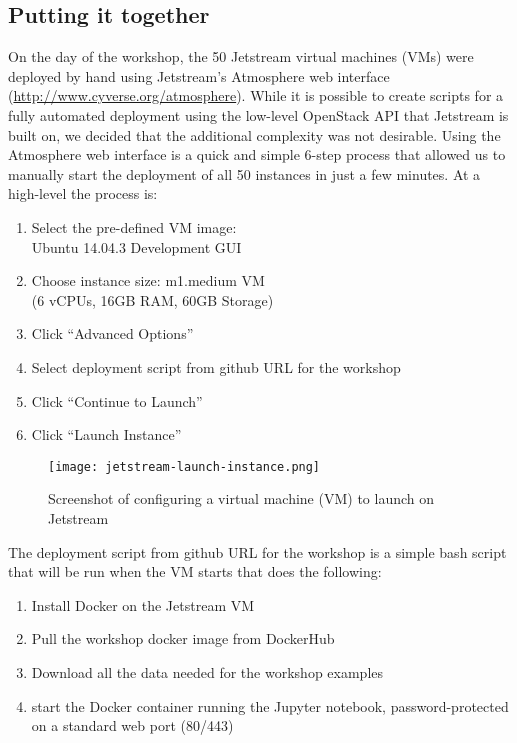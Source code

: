 \subsection{Putting it together}

On the day of the workshop, the 50 Jetstream virtual machines (VMs) were
deployed by hand using Jetstream's Atmosphere\cite{NiravCyberinfra2016} web interface
(\url{http://www.cyverse.org/atmosphere}). While it is possible to create
scripts for a fully automated deployment using the low-level OpenStack API that
Jetstream is built on, we decided that the additional complexity was not
desirable. Using the Atmosphere web interface is a quick and simple 6-step
process that allowed us to manually start the deployment of all 50 instances in
just a few minutes. At a high-level the process is:

\begin{enumerate}
\item Select the pre-defined VM image: \\Ubuntu 14.04.3 Development GUI
\item Choose instance size: m1.medium VM \\(6 vCPUs, 16GB RAM, 60GB
  Storage)
\item Click ``Advanced Options''
\item Select deployment script from github URL for the workshop
\item Click ``Continue to Launch''
\item Click ``Launch Instance''
\end{enumerate}

\begin{figure}[h]
\centering
\texttt{[image: jetstream-launch-instance.png]}
\caption{Screenshot of configuring a virtual machine (VM) to launch on Jetstream}
\end{figure}

The deployment script from github URL for the workshop is a simple bash script
that will be run when the VM starts that does the following:

\begin{enumerate}
\item Install Docker on the Jetstream VM
\item Pull the workshop docker image from DockerHub
\item Download all the data needed for the workshop examples
\item start the Docker container running the Jupyter notebook, password-protected on a standard web port (80/443)
\end{enumerate}

